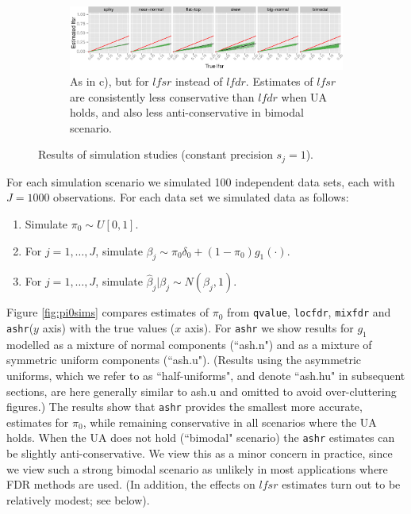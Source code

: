 \documentclass[11pt]{article}
\def\lfdr{\textit{lfdr}}
\def\lfsr{\textit{lfsr}}
\def\bhat{\hat{\beta}}
\def\shat{\hat{s}}
\def\qvalue{{\tt qvalue}\xspace}
\def\locfdr{{\tt locfdr}\xspace}
\def\mixfdr{{\tt mixfdr}\xspace}
\def\ashr{{\tt ashr}\xspace}
\begin{document}
\begin{figure}
\begin{center}
\begin{subfigure}{\textwidth}
\includegraphics[width=\textwidth]{../analysis/figure/plot_lfsr.Rmd/plot_lfsr-1.pdf} 
\caption{As in c), but for $\lfsr$ instead of $\lfdr$. Estimates of $\lfsr$ are consistently less conservative than $\lfdr$ when UA holds, and also less anti-conservative in bimodal scenario.}  \label{fig:lfsr}
\end{subfigure}
\end{center}
\caption{Results of simulation studies (constant precision $s_j=1$).}
\end{figure}


For each simulation scenario we simulated 100 independent data sets, each with $J=1000$ observations. For each data set we simulated
data as follows:
\begin{enumerate}
\item Simulate $\pi_0  \sim U[0,1]$.
\item For $j=1,\dots,J$, simulate $\beta_j \sim \pi_0 \delta_0 + (1-\pi_0) g_1(\cdot)$.
\item For $j=1,\dots,J$, simulate $\bhat_j | \beta_j \sim N(\beta_j,1)$.
\end{enumerate}

Figure \ref{fig:pi0sims} compares estimates of $\pi_0$ from \qvalue, \locfdr, \mixfdr and \ashr ($y$ axis) with the true values ($x$ axis). 
For \ashr we show results for $g_1$ modelled as a mixture of normal components (``ash.n") 
and as a mixture of symmetric uniform components (``ash.u"). (Results using the asymmetric uniforms, which we refer to
as ``half-uniforms", and denote ``ash.hu" in subsequent sections, are here generally similar to ash.u and omitted to avoid over-cluttering figures.)
The results show that \ashr provides the smallest more accurate, estimates for $\pi_0$, while remaining conservative
in all scenarios where the UA holds. When the UA does not hold (``bimodal" scenario) the \ashr estimates can be slightly anti-conservative.
We view this as a minor concern in practice, since we view such a strong bimodal scenario as unlikely in most applications where FDR methods
are used. (In addition, the effects on $\lfsr$ estimates turn out to be relatively modest; see below). 
\end{document}
